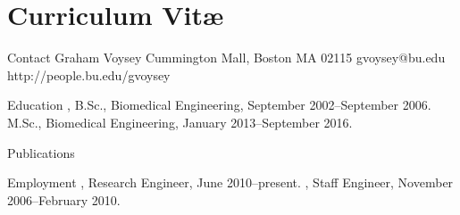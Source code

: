 \chapter*{Curriculum Vit\ae}

\begin{category}{Contact}
\citemnobullet Graham Voysey
 Cummington Mall, Boston MA 02115
\citemnobullet gvoysey@bu.edu
\citemnobullet http://people.bu.edu/gvoysey
\end{category}

\begin{category}{Education}
, B.Sc., Biomedical Engineering, September 2002--September 2006.
 M.Sc., Biomedical Engineering,  January 2013--September 2016.
\end{category}

\begin{category}{Publications}
\citemenum {}
\citemenum {}
\citemenum {}
\end{category}

\begin{category}{Employment}
, Research Engineer, June 2010--present.
, Staff Engineer, November 2006--February 2010.


\end{category}